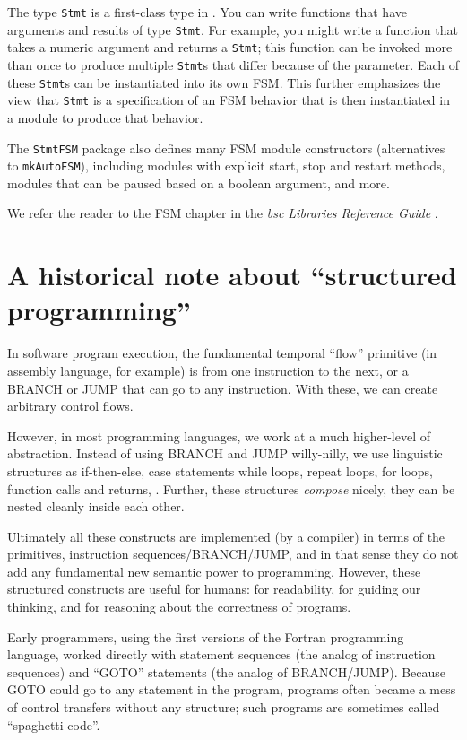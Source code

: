 The type \verb|Stmt| is a first-class type in {\BSV}.  You can write
functions that have arguments and results of type \verb|Stmt|.  For
example, you might write a function that takes a numeric argument and
returns a \verb|Stmt|; this function can be invoked more than once to
produce multiple \verb|Stmt|s that differ because of the parameter.
Each of these \verb|Stmt|s can be instantiated into its own FSM.  This
further emphasizes the view that \verb|Stmt| is a specification of an
FSM behavior that is then instantiated in a module to produce that
behavior.

The \verb|StmtFSM| package also defines many FSM module constructors
(alternatives to \verb|mkAutoFSM|), including modules with explicit
start, stop and restart methods, modules that can be paused based on a
boolean argument, and more.

We refer the reader to the FSM chapter in the \emph{bsc Libraries
Reference Guide} \cite{bsc_libs_ref_guide}.


\section{A historical note about ``structured programming''}

In software program execution, the fundamental temporal ``flow''
primitive (in assembly language, for example) is from one instruction
to the next, or a BRANCH or JUMP that can go to any instruction.  With
these, we can create arbitrary control flows.

However, in most programming languages, we work at a much higher-level
of abstraction.  Instead of using BRANCH and JUMP willy-nilly, we use
linguistic structures as if-then-else, case statements while loops,
repeat loops, for loops, function calls and returns, {\etc}.  Further,
these structures \emph{compose} nicely, {\ie} they can be nested
cleanly inside each other.

Ultimately all these constructs are implemented (by a compiler) in
terms of the primitives, instruction sequences/BRANCH/JUMP, and in
that sense they do not add any fundamental new semantic power to
programming.  However, these structured constructs are useful for
humans: for readability, for guiding our thinking, and for reasoning
about the correctness of programs.

Early programmers, {\eg} using the first versions of the Fortran
programming language, worked directly with statement sequences (the
analog of instruction sequences) and ``GOTO'' statements (the analog
of BRANCH/JUMP).  Because GOTO could go to any statement in the
program, programs often became a mess of control transfers without any
structure; such programs are sometimes called ``spaghetti code''.

